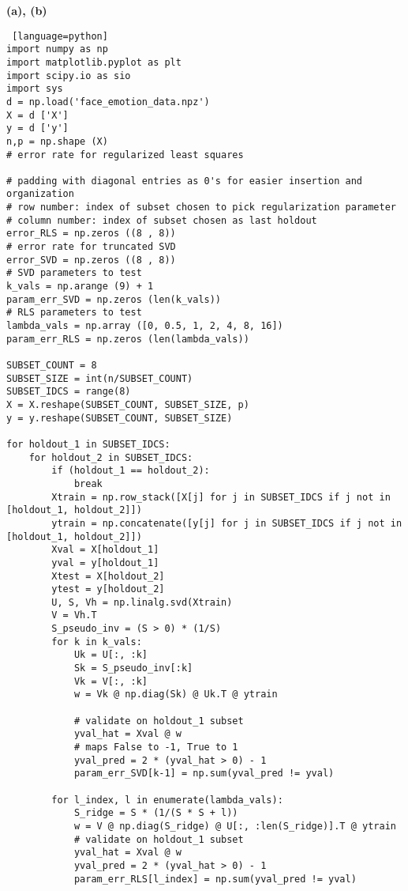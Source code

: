 \documentclass[a4paper, 12pt]{article}
\begin{document}
\begin{problem} [Problem 6]
\end{problem}
\begin{solution}
    \textbf{(a), (b)}
    \begin{lstlisting} [language=python]
import numpy as np
import matplotlib.pyplot as plt
import scipy.io as sio
import sys
d = np.load('face_emotion_data.npz')
X = d ['X']
y = d ['y']
n,p = np.shape (X)
# error rate for regularized least squares

# padding with diagonal entries as 0's for easier insertion and organization
# row number: index of subset chosen to pick regularization parameter
# column number: index of subset chosen as last holdout
error_RLS = np.zeros ((8 , 8))
# error rate for truncated SVD
error_SVD = np.zeros ((8 , 8))
# SVD parameters to test
k_vals = np.arange (9) + 1
param_err_SVD = np.zeros (len(k_vals))
# RLS parameters to test
lambda_vals = np.array ([0, 0.5, 1, 2, 4, 8, 16])
param_err_RLS = np.zeros (len(lambda_vals))

SUBSET_COUNT = 8
SUBSET_SIZE = int(n/SUBSET_COUNT)
SUBSET_IDCS = range(8)
X = X.reshape(SUBSET_COUNT, SUBSET_SIZE, p)
y = y.reshape(SUBSET_COUNT, SUBSET_SIZE)

for holdout_1 in SUBSET_IDCS:
    for holdout_2 in SUBSET_IDCS:
        if (holdout_1 == holdout_2):
            break
        Xtrain = np.row_stack([X[j] for j in SUBSET_IDCS if j not in [holdout_1, holdout_2]])
        ytrain = np.concatenate([y[j] for j in SUBSET_IDCS if j not in [holdout_1, holdout_2]])
        Xval = X[holdout_1]
        yval = y[holdout_1]
        Xtest = X[holdout_2]
        ytest = y[holdout_2]
        U, S, Vh = np.linalg.svd(Xtrain)
        V = Vh.T
        S_pseudo_inv = (S > 0) * (1/S)
        for k in k_vals:
            Uk = U[:, :k]
            Sk = S_pseudo_inv[:k]
            Vk = V[:, :k]
            w = Vk @ np.diag(Sk) @ Uk.T @ ytrain
            
            # validate on holdout_1 subset
            yval_hat = Xval @ w
            # maps False to -1, True to 1
            yval_pred = 2 * (yval_hat > 0) - 1
            param_err_SVD[k-1] = np.sum(yval_pred != yval)
            
        for l_index, l in enumerate(lambda_vals):
            S_ridge = S * (1/(S * S + l))
            w = V @ np.diag(S_ridge) @ U[:, :len(S_ridge)].T @ ytrain
            # validate on holdout_1 subset
            yval_hat = Xval @ w
            yval_pred = 2 * (yval_hat > 0) - 1
            param_err_RLS[l_index] = np.sum(yval_pred != yval)
            

\end{lstlisting}
\end{solution}
\end{document}
